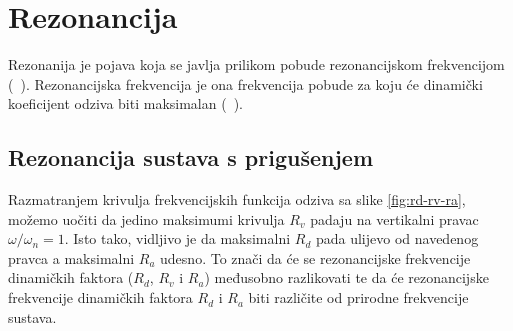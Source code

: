 \section{Rezonancija}
Rezonanija je pojava koja se javlja prilikom pobude rezonancijskom frekvencijom (~\cite{dk_skripta}).
Rezonancijska frekvencija je ona frekvencija pobude za koju će dinamički koeficijent
odziva biti maksimalan (~\cite{dk_skripta}). 
\par

\subsection{Rezonancija sustava s prigušenjem}
Razmatranjem krivulja frekvencijskih funkcija odziva sa slike 
\ref{fig:rd-rv-ra}, možemo uočiti da jedino maksimumi krivulja $R_v$ padaju na 
vertikalni pravac $\omega/\omega_n=1$. Isto tako, vidljivo je da maksimalni $R_d$
pada ulijevo od navedenog pravca a maksimalni $R_a$ udesno. To znači da će se 
rezonancijske frekvencije dinamičkih faktora ($R_d$, $R_v$ i $R_a$) međusobno razlikovati 
te da će rezonancijske frekvencije dinamičkih faktora $R_d$ i $R_a$ biti različite od
prirodne frekvencije sustava.

